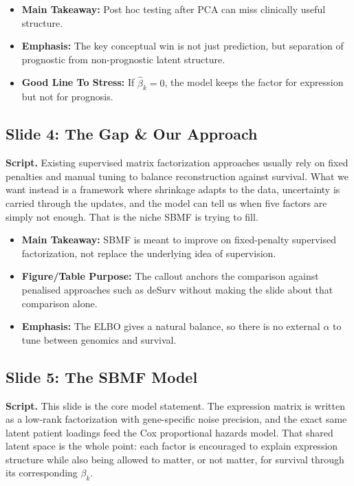 \documentclass[11pt]{article}
\newcommand{\sectionlabel}[1]{\textbf{#1}}
\begin{document}
\begin{itemize}
\item \sectionlabel{Main Takeaway:} Post hoc testing after PCA can miss clinically useful structure.
\item \sectionlabel{Emphasis:} The key conceptual win is not just prediction, but separation of prognostic from non-prognostic latent structure.
\item \sectionlabel{Good Line To Stress:} If $\hat{\beta}_k = 0$, the model keeps the factor for expression but not for prognosis.
\end{itemize}

\subsection*{Slide 4: The Gap \& Our Approach}
\textbf{Script.} Existing supervised matrix factorization approaches usually rely on fixed penalties and manual tuning to balance reconstruction against survival. What we want instead is a framework where shrinkage adapts to the data, uncertainty is carried through the updates, and the model can tell us when five factors are simply not enough. That is the niche SBMF is trying to fill.

\begin{itemize}
\item \sectionlabel{Main Takeaway:} SBMF is meant to improve on fixed-penalty supervised factorization, not replace the underlying idea of supervision.
\item \sectionlabel{Figure/Table Purpose:} The callout anchors the comparison against penalised approaches such as deSurv without making the slide about that comparison alone.
\item \sectionlabel{Emphasis:} The ELBO gives a natural balance, so there is no external $\alpha$ to tune between genomics and survival.
\end{itemize}

\subsection*{Slide 5: The SBMF Model}
\textbf{Script.} This slide is the core model statement. The expression matrix is written as a low-rank factorization with gene-specific noise precision, and the exact same latent patient loadings feed the Cox proportional hazards model. That shared latent space is the whole point: each factor is encouraged to explain expression structure while also being allowed to matter, or not matter, for survival through its corresponding $\beta_k$.
\end{document}
